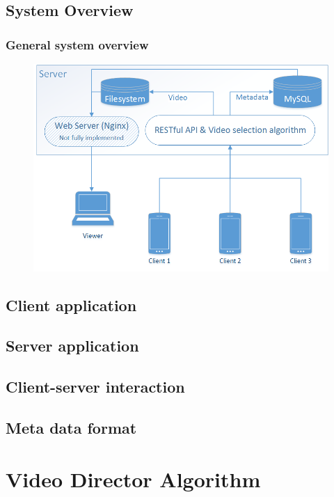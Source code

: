 \documentclass[10pt,pdf]{beamer}
\begin{document}
	\subsection{System Overview}
	\begin{frame}
		\frametitle{General system overview}
		\begin{figure}[!t]
			\centering
			\includegraphics[width=\textwidth,height=.9\textheight,keepaspectratio]{sys_arch.png}
			\label{fig:gen_arch}
		\end{figure}
	\end{frame}

	\subsection{Client application}
	

	\subsection{Server application}
	

	\subsection{Client-server interaction}
	

	\subsection{Meta data format}
	

\section{Video Director Algorithm}

	
\end{document}

